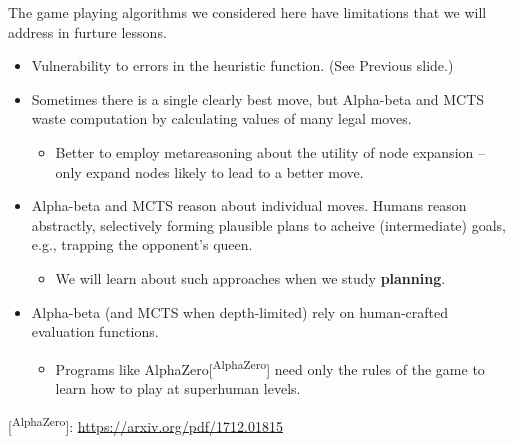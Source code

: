 \documentclass[11pt]{article}
\begin{document}
The game playing algorithms we considered here have limitations that we will address in furture lessons.

\begin{itemize}
\item Vulnerability to errors in the heuristic function. (See Previous slide.)
\item Sometimes there is a single clearly best move, but Alpha-beta and MCTS waste computation by calculating values of many legal moves.

\begin{itemize}
\item Better to employ metareasoning about the utility of node expansion -- only expand nodes likely to lead to a better move.
\end{itemize}

\item Alpha-beta and MCTS reason about individual moves.  Humans reason abstractly, selectively forming plausible plans to acheive (intermediate) goals, e.g., trapping the opponent's queen.

\begin{itemize}
\item We will learn about such approaches when we study \textbf{planning}.
\end{itemize}

\item Alpha-beta (and MCTS when depth-limited) rely on human-crafted evaluation functions.

\begin{itemize}
\item Programs like AlphaZero[\textsuperscript{AlphaZero}] need only the rules of the game to learn how to play at superhuman levels.
\end{itemize}
\end{itemize}


{[}\textsuperscript{AlphaZero}]: \url{https://arxiv.org/pdf/1712.01815}
\end{document}
